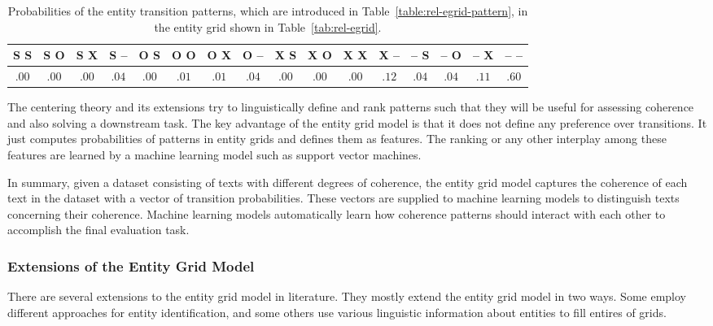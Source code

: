 \begin{table}
	\begin{center}
		\resizebox{\columnwidth}{!}
		{%
			\begin{tabular}{@{}cccccccccccccccc@{}}
				\toprule
				S S & S O & S X & S -- & O S & O O & O X & O -- & X S & X O & X X & X -- & -- S & -- O & -- X & -- -- \\
				\midrule
				$.00$ & $.00$ & $.00$ & $.04$ & $.00$ & $.01$ & $.01$ & $.04$ & $.00$ & $.00$ & $.00$ & $.12$ & $.04$ & $.04$ & $.11$ & $.60$ \\
				\bottomrule
			\end{tabular}
		}%
	\end{center}
	\caption{
	Probabilities of the entity transition patterns, which are introduced in Table~\ref{table:rel-egrid-pattern}, in the entity grid shown in Table~\ref{tab:rel-egrid}.
	}
	\label{tab:rel-egrid-probs}
\end{table}

The centering theory and its extensions try to linguistically define and rank patterns such that they will be useful for assessing coherence and also solving a downstream task.  
The key advantage of the entity grid model is that it does not define any preference over transitions. 
It just computes probabilities of patterns in entity grids and defines them as features. 
The ranking or any other interplay among these features are learned by a machine learning model such as support vector machines. 

In summary, given a dataset consisting of texts with different degrees of coherence, the entity grid model captures the coherence of each text in the dataset with a vector of transition probabilities. 
These vectors are supplied to machine learning models to distinguish texts concerning their coherence.  
Machine learning models automatically learn how coherence patterns should interact with each other to accomplish the final evaluation task.  

\subsubsection{Extensions of the Entity Grid Model}
%
There are several extensions to the entity grid model in literature.  
They mostly extend the entity grid model in two ways. 
Some employ different approaches for entity identification, and some others use various linguistic information about entities to fill entires of grids. 

